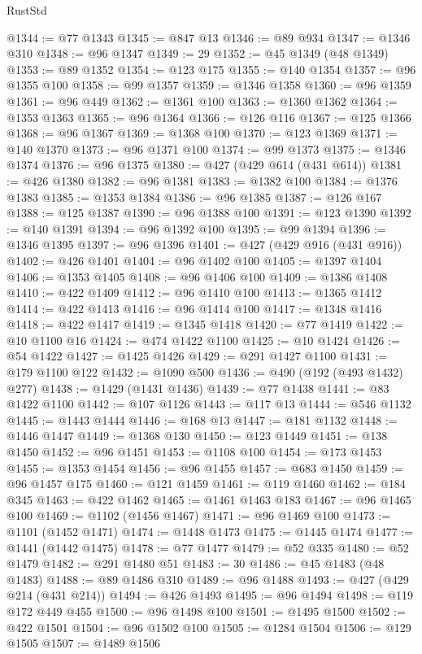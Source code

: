 \begin{lexlean}{RustStd}
\begin{coremodule}
@1344 := @77 @1343
@1345 := @847 @13
@1346 := @89 @934
@1347 := @1346 @310
@1348 := @96 @1347
@1349 := 29
@1352 := @45 @1349 (@48 @1349)
@1353 := @89 @1352
@1354 := @123 @175
@1355 := @140 @1354
@1357 := @96 @1355 @100
@1358 := @99 @1357
@1359 := @1346 @1358
@1360 := @96 @1359
@1361 := @96 @449
@1362 := @1361 @100
@1363 := @1360 @1362
@1364 := @1353 @1363
@1365 := @96 @1364
@1366 := @126 @116
@1367 := @125 @1366
@1368 := @96 @1367
@1369 := @1368 @100
@1370 := @123 @1369
@1371 := @140 @1370
@1373 := @96 @1371 @100
@1374 := @99 @1373
@1375 := @1346 @1374
@1376 := @96 @1375
@1380 := @427 (@429 @614 (@431 @614))
@1381 := @426 @1380
@1382 := @96 @1381
@1383 := @1382 @100
@1384 := @1376 @1383
@1385 := @1353 @1384
@1386 := @96 @1385
@1387 := @126 @167
@1388 := @125 @1387
@1390 := @96 @1388 @100
@1391 := @123 @1390
@1392 := @140 @1391
@1394 := @96 @1392 @100
@1395 := @99 @1394
@1396 := @1346 @1395
@1397 := @96 @1396
@1401 := @427 (@429 @916 (@431 @916))
@1402 := @426 @1401
@1404 := @96 @1402 @100
@1405 := @1397 @1404
@1406 := @1353 @1405
@1408 := @96 @1406 @100
@1409 := @1386 @1408
@1410 := @422 @1409
@1412 := @96 @1410 @100
@1413 := @1365 @1412
@1414 := @422 @1413
@1416 := @96 @1414 @100
@1417 := @1348 @1416
@1418 := @422 @1417
@1419 := @1345 @1418
@1420 := @77 @1419
@1422 := @10 @1100 @16
@1424 := @474 @1422 @1100
@1425 := @10 @1424
@1426 := @54 @1422
@1427 := @1425 @1426
@1429 := @291 @1427 @1100
@1431 := @179 @1100 @122
@1432 := @1090 @500
@1436 := @490 (@192 (@493 @1432) @277)
@1438 := @1429 (@1431 @1436)
@1439 := @77 @1438
@1441 := @83 @1422 @1100
@1442 := @107 @1126
@1443 := @117 @13
@1444 := @546 @1132
@1445 := @1443 @1444
@1446 := @168 @13
@1447 := @181 @1132
@1448 := @1446 @1447
@1449 := @1368 @130
@1450 := @123 @1449
@1451 := @138 @1450
@1452 := @96 @1451
@1453 := @1108 @100
@1454 := @173 @1453
@1455 := @1353 @1454
@1456 := @96 @1455
@1457 := @683 @1450
@1459 := @96 @1457 @175
@1460 := @121 @1459
@1461 := @119 @1460
@1462 := @184 @345
@1463 := @422 @1462
@1465 := @1461 @1463 @183
@1467 := @96 @1465 @100
@1469 := @1102 (@1456 @1467)
@1471 := @96 @1469 @100
@1473 := @1101 (@1452 @1471)
@1474 := @1448 @1473
@1475 := @1445 @1474
@1477 := @1441 (@1442 @1475)
@1478 := @77 @1477
@1479 := @52 @335
@1480 := @52 @1479
@1482 := @291 @1480 @51
@1483 := 30
@1486 := @45 @1483 (@48 @1483)
@1488 := @89 @1486 @310
@1489 := @96 @1488
@1493 := @427 (@429 @214 (@431 @214))
@1494 := @426 @1493
@1495 := @96 @1494
@1498 := @119 @172 @449 @455
@1500 := @96 @1498 @100
@1501 := @1495 @1500
@1502 := @422 @1501
@1504 := @96 @1502 @100
@1505 := @1284 @1504
@1506 := @129 @1505
@1507 := @1489 @1506

\end{coremodule}
\end{lexlean}
